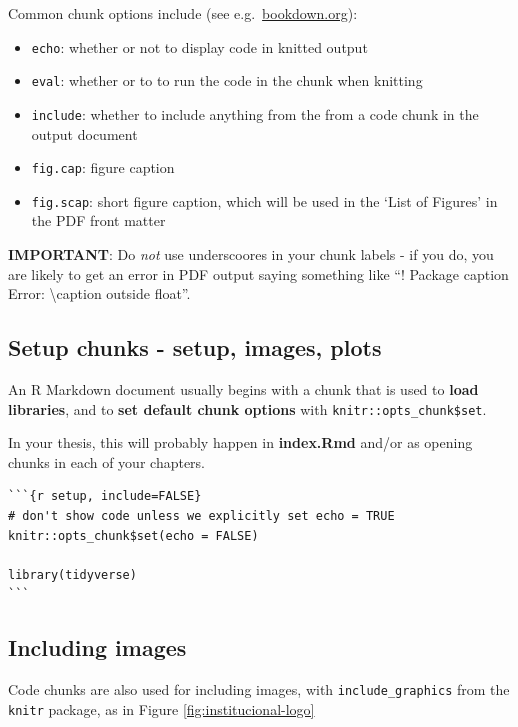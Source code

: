 \documentclass[a4paper, nobind]{templates/ociamthesis}
\providecommand{\tightlist}{%
  \setlength{\itemsep}{0pt}\setlength{\parskip}{0pt}}
\begin{document}
Common chunk options include (see e.g.~\href{https://bookdown.org/yihui/rmarkdown/r-code.html}{bookdown.org}):

\begin{itemize}
\tightlist
\item
  \texttt{echo}: whether or not to display code in knitted output
\item
  \texttt{eval}: whether or to to run the code in the chunk when knitting
\item
  \texttt{include}: whether to include anything from the from a code chunk in the output document
\item
  \texttt{fig.cap}: figure caption
\item
  \texttt{fig.scap}: short figure caption, which will be used in the `List of Figures' in the PDF front matter
\end{itemize}

\textbf{IMPORTANT}: Do \emph{not} use underscoores in your chunk labels - if you do, you are likely to get an error in PDF output saying something like ``! Package caption Error: \textbackslash caption outside float''.

\subsection{Setup chunks - setup, images, plots}\label{setup-chunks---setup-images-plots}

An R Markdown document usually begins with a chunk that is used to \textbf{load libraries}, and to \textbf{set default chunk options} with \texttt{knitr::opts\_chunk\$set}.

In your thesis, this will probably happen in \textbf{index.Rmd} and/or as opening chunks in each of your chapters.

\begin{verbatim}
```{r setup, include=FALSE}
# don't show code unless we explicitly set echo = TRUE
knitr::opts_chunk$set(echo = FALSE)

library(tidyverse)
```
\end{verbatim}

\subsection{Including images}\label{including-images}

Code chunks are also used for including images, with \texttt{include\_graphics} from the \texttt{knitr} package, as in Figure \ref{fig:institucional-logo}
\end{document}

